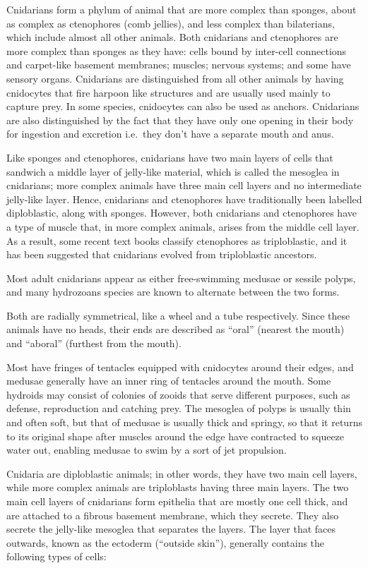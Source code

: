Cnidarians form a phylum of animal that are more complex than sponges, about as complex as ctenophores (comb jellies), and less complex than bilaterians, which include almost all other animals. Both cnidarians and ctenophores are more complex than sponges as they have: cells bound by inter-cell connections and carpet-like basement membranes; muscles; nervous systems; and some have sensory organs. Cnidarians are distinguished from all other animals by having cnidocytes that fire harpoon like structures and are usually used mainly to capture prey. In some species, cnidocytes can also be used as anchors. Cnidarians are also distinguished by the fact that they have only one opening in their body for ingestion and excretion i.e.~they don't have a separate mouth and anus.

Like sponges and ctenophores, cnidarians have two main layers of cells that sandwich a middle layer of jelly-like material, which is called the mesoglea in cnidarians; more complex animals have three main cell layers and no intermediate jelly-like layer. Hence, cnidarians and ctenophores have traditionally been labelled diploblastic, along with sponges. However, both cnidarians and ctenophores have a type of muscle that, in more complex animals, arises from the middle cell layer. As a result, some recent text books classify ctenophores as triploblastic, and it has been suggested that cnidarians evolved from triploblastic ancestors.

Most adult cnidarians appear as either free-swimming medusae or sessile polyps, and many hydrozoans species are known to alternate between the two forms.

Both are radially symmetrical, like a wheel and a tube respectively. Since these animals have no heads, their ends are described as ``oral'' (nearest the mouth) and ``aboral'' (furthest from the mouth).

Most have fringes of tentacles equipped with cnidocytes around their edges, and medusae generally have an inner ring of tentacles around the mouth. Some hydroids may consist of colonies of zooids that serve different purposes, such as defense, reproduction and catching prey. The mesoglea of polyps is usually thin and often soft, but that of medusae is usually thick and springy, so that it returns to its original shape after muscles around the edge have contracted to squeeze water out, enabling medusae to swim by a sort of jet propulsion.

Cnidaria are diploblastic animals; in other words, they have two main cell layers, while more complex animals are triploblasts having three main layers. The two main cell layers of cnidarians form epithelia that are mostly one cell thick, and are attached to a fibrous basement membrane, which they secrete. They also secrete the jelly-like mesoglea that separates the layers. The layer that faces outwards, known as the ectoderm (``outside skin''), generally contains the following types of cells:

